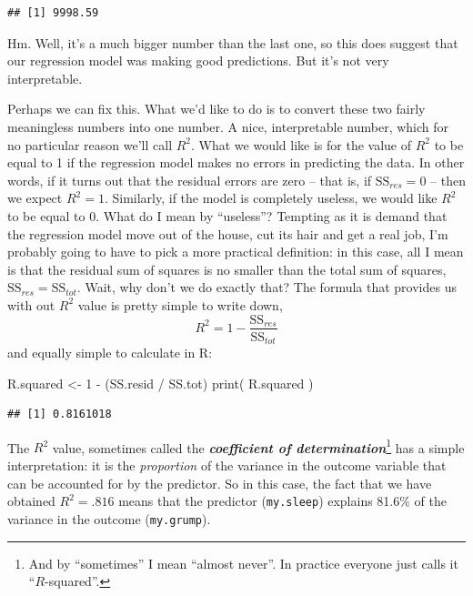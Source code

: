 \documentclass[
]{book}
\newenvironment{Shaded}{\begin{snugshade}}{\end{snugshade}}
\newcommand{\DecValTok}[1]{\textcolor[rgb]{0.00,0.00,0.81}{#1}}
\newcommand{\FunctionTok}[1]{\textcolor[rgb]{0.00,0.00,0.00}{#1}}
\newcommand{\NormalTok}[1]{#1}
\newcommand{\OtherTok}[1]{\textcolor[rgb]{0.56,0.35,0.01}{#1}}
\newcommand{\SpecialCharTok}[1]{\textcolor[rgb]{0.00,0.00,0.00}{#1}}
\begin{document}
\begin{verbatim}
## [1] 9998.59
\end{verbatim}

Hm. Well, it's a much bigger number than the last one, so this does suggest that our regression model was making good predictions. But it's not very interpretable.

Perhaps we can fix this. What we'd like to do is to convert these two fairly meaningless numbers into one number. A nice, interpretable number, which for no particular reason we'll call \(R^2\). What we would like is for the value of \(R^2\) to be equal to 1 if the regression model makes no errors in predicting the data. In other words, if it turns out that the residual errors are zero -- that is, if \(\mbox{SS}_{res} = 0\) -- then we expect \(R^2 = 1\). Similarly, if the model is completely useless, we would like \(R^2\) to be equal to 0. What do I mean by ``useless''? Tempting as it is demand that the regression model move out of the house, cut its hair and get a real job, I'm probably going to have to pick a more practical definition: in this case, all I mean is that the residual sum of squares is no smaller than the total sum of squares, \(\mbox{SS}_{res} = \mbox{SS}_{tot}\). Wait, why don't we do exactly that? The formula that provides us with out \(R^2\) value is pretty simple to write down,
\[
R^2 = 1 - \frac{\mbox{SS}_{res}}{\mbox{SS}_{tot}}
\]
and equally simple to calculate in R:

\begin{Shaded}
\begin{Highlighting}[]
\NormalTok{R.squared }\OtherTok{\textless{}{-}} \DecValTok{1} \SpecialCharTok{{-}}\NormalTok{ (SS.resid }\SpecialCharTok{/}\NormalTok{ SS.tot)}
\FunctionTok{print}\NormalTok{( R.squared )}
\end{Highlighting}
\end{Shaded}

\begin{verbatim}
## [1] 0.8161018
\end{verbatim}

The \(R^2\) value, sometimes called the \textbf{\emph{coefficient of determination}}\footnote{And by ``sometimes'' I mean ``almost never''. In practice everyone just calls it ``\(R\)-squared''.} has a simple interpretation: it is the \emph{proportion} of the variance in the outcome variable that can be accounted for by the predictor. So in this case, the fact that we have obtained \(R^2 = .816\) means that the predictor (\texttt{my.sleep}) explains 81.6\% of the variance in the outcome (\texttt{my.grump}).
\end{document}
